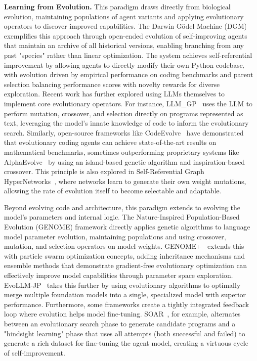 \documentclass[10pt]{article} %
\begin{document}
\textbf{Learning from Evolution.} 
This paradigm draws directly from biological evolution, maintaining populations of agent variants and applying evolutionary operators to discover improved capabilities. The Darwin Gödel Machine (DGM) \citep{zhang2025darwin} exemplifies this approach through open-ended evolution of self-improving agents that maintain an archive of all historical versions, enabling branching from any past "species" rather than linear optimization. The system achieves self-referential improvement by allowing agents to directly modify their own Python codebase, with evolution driven by empirical performance on coding benchmarks and parent selection balancing performance scores with novelty rewards for diverse exploration. Recent work has further explored using LLMs themselves to implement core evolutionary operators. For instance, LLM\_GP~\citep{hemberg2024evolving} uses the LLM to perform mutation, crossover, and selection directly on programs represented as text, leveraging the model's innate knowledge of code to inform the evolutionary search. Similarly, open-source frameworks like CodeEvolve~\citep{assumpccao2025codeevolve} have demonstrated that evolutionary coding agents can achieve state-of-the-art results on mathematical benchmarks, sometimes outperforming proprietary systems like AlphaEvolve~\citep{novikov2025alphaevolve} by using an island-based genetic algorithm and inspiration-based crossover. This principle is also explored in Self-Referential Graph HyperNetworks~\citep{pedersen2025hypernetworks}, where networks learn to generate their own weight mutations, allowing the rate of evolution itself to become selectable and adaptable.

Beyond evolving code and architecture, this paradigm extends to evolving the model's parameters and internal logic. The Nature-Inspired Population-Based Evolution (GENOME) framework \citep{zhang2025nature} directly applies genetic algorithms to language model parameter evolution, maintaining populations and using crossover, mutation, and selection operators on model weights. GENOME+~\citep{zhang2025nature} extends this with particle swarm optimization concepts, adding inheritance mechanisms and ensemble methods that demonstrate gradient-free evolutionary optimization can effectively improve model capabilities through parameter space exploration. EvoLLM-JP~\citep{akiba2025evolutionary} takes this further by using evolutionary algorithms to optimally merge multiple foundation models into a single, specialized model with superior performance. Furthermore, some frameworks create a tightly integrated feedback loop where evolution helps model fine-tuning. SOAR~\citep{pourcel2025soar}, for example, alternates between an evolutionary search phase to generate candidate programs and a "hindsight learning" phase that uses all attempts (both successful and failed) to generate a rich dataset for fine-tuning the agent model, creating a virtuous cycle of self-improvement.
\end{document}
